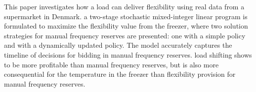 This paper investigates how a   load can deliver flexibility  %
 using real data from a supermarket in Denmark.  a two-stage stochastic mixed-integer linear program is formulated to maximize the flexibility value from the freezer, where two solution strategies for manual frequency reserves are presented: one with a simple policy and  with a dynamically updated policy. The  model accurately captures the timeline of decisions for bidding in manual frequency reserves.
 load shifting shows to be more profitable than  manual frequency reserves, but is also more consequential for the temperature in the freezer than flexibility provision for manual frequency reserves.
